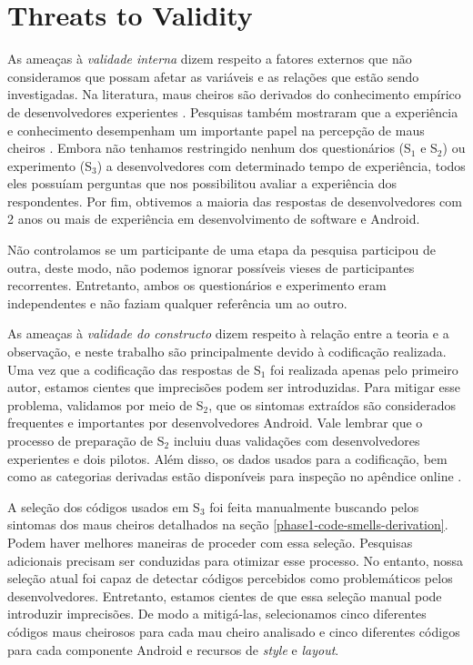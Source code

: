 \section{Threats to Validity}
\label{ameacas}

As ameaças à \textit{validade interna} dizem respeito a fatores externos que não consideramos que possam afetar as variáveis e as relações que estão sendo investigadas. 
Na literatura, maus cheiros são derivados do conhecimento empírico de desenvolvedores experientes \cite{Refactoring:99, Riel:96, CleanCode:08, Webster:95}. Pesquisas também mostraram que a experiência e conhecimento desempenham um importante papel na percepção de maus cheiros \cite{Palomba_Do_2014, Taibi:17}. Embora não tenhamos restringido nenhum dos questionários (S$_1$ e S$_2$) ou experimento (S$_3$) a desenvolvedores com determinado tempo de experiência, todos eles possuíam perguntas que nos possibilitou avaliar a experiência dos respondentes. Por fim, obtivemos a maioria das respostas de desenvolvedores com 2 anos ou mais de experiência em desenvolvimento de software e Android.

Não controlamos se um participante de uma etapa da pesquisa participou de outra, deste modo, não podemos ignorar possíveis vieses de participantes recorrentes. Entretanto, ambos os questionários e experimento eram independentes e não faziam qualquer referência um ao outro.


As ameaças à \textit{validade do constructo} dizem respeito à relação entre a teoria e a observação, e neste trabalho são principalmente devido à codificação realizada. Uma vez que a codificação das respostas de S$_1$ foi realizada apenas pelo primeiro autor, estamos cientes que imprecisões podem ser introduzidas. Para mitigar esse problema, validamos por meio de S$_2$, que os sintomas extraídos são considerados frequentes e importantes por desenvolvedores Android. Vale lembrar que o processo de preparação de S$_2$ incluiu duas validações com desenvolvedores experientes e dois pilotos. Além disso, os dados usados para a codificação, bem como as categorias derivadas estão disponíveis para inspeção no apêndice online \cite{apendice}.

A seleção dos códigos usados em S$_3$ foi feita manualmente buscando pelos sintomas dos maus cheiros detalhados na seção \ref{phase1-code-smells-derivation}. Podem haver melhores maneiras de proceder com essa seleção. Pesquisas adicionais precisam ser conduzidas para otimizar esse processo. No entanto, nossa seleção atual foi capaz de detectar códigos percebidos como problemáticos pelos desenvolvedores. Entretanto, estamos cientes de que essa seleção manual pode introduzir imprecisões. De modo a mitigá-las, selecionamos cinco diferentes códigos maus cheirosos para cada mau cheiro analisado e cinco diferentes códigos para cada componente Android e recursos de \textit{style} e \textit{layout}. 


